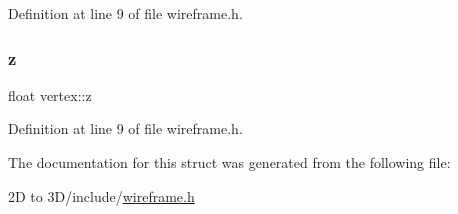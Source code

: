 Definition at line 9 of file wireframe.\+h.

\mbox{\label{structvertex_afe9862f7d3456ee2d352d94cbe5a84da}} 
\subsubsection{\texorpdfstring{z}{z}}
{\footnotesize\ttfamily float vertex\+::z}



Definition at line 9 of file wireframe.\+h.



The documentation for this struct was generated from the following file\+:\begin{DoxyCompactItemize}
\item 
2\+D to 3\+D/include/\mbox{\hyperlink{wireframe_8h}{wireframe.\+h}}\end{DoxyCompactItemize}
